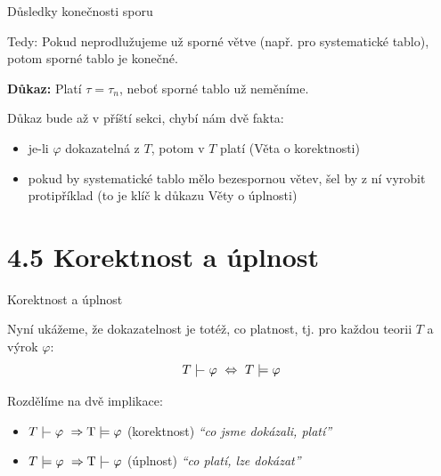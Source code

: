 \documentclass{beamer}
\begin{document}
\begin{frame}{Důsledky konečnosti sporu}
    
    Tedy: Pokud neprodlužujeme už sporné větve (např. pro systematické tablo), potom sporné tablo je konečné.
    \medskip

    \pause

    \pause
    \textbf{Důkaz:} 
    Platí $\tau=\tau_n$, neboť sporné tablo už neměníme.\hfill\qedsymbol   

    \bigskip

    \pause

    \pause
    Důkaz bude až v příští sekci, chybí nám dvě fakta:\pause
    \begin{itemize}
        \item je-li $\varphi$ dokazatelná z $T$, potom v $T$ platí (Věta o korektnosti)\pause
        \item pokud by systematické tablo mělo bezespornou větev, šel by z ní vyrobit protipříklad (to je klíč k důkazu Věty o úplnosti)
    \end{itemize}

\end{frame}


\section{4.5 Korektnost a úplnost}


\begin{frame}{Korektnost a úplnost}
    
    Nyní ukážeme, že \alert{dokazatelnost} je totéž, co \alert{platnost}, tj. pro každou teorii $T$ a výrok $\varphi$:
    \alert{
    $$
    T\proves\varphi\ \Leftrightarrow\ T\models\varphi
    $$
    }

    \pause
    Rozdělíme na dvě implikace:\pause
    
    \begin{itemize}
        \item \alert{$T\proves\varphi\ \Rightarrow\T\models\varphi$} \hspace{0.5cm} (korektnost) \hfill {\it``co jsme dokázali, platí''}\pause
        \item\alert{$T\models\varphi\ \Rightarrow\T\proves\varphi$}  \hspace{0.5cm} (úplnost) \hfill {\it ``co platí, lze dokázat''}
    \end{itemize} 
 
\end{frame}
\end{document}
